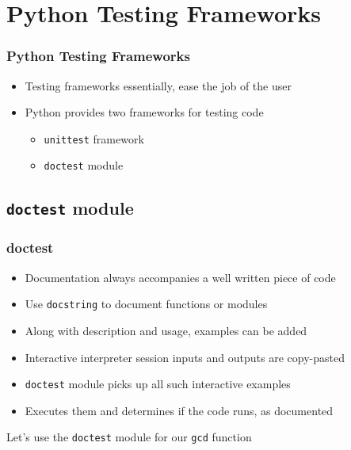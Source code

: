 \documentclass[12pt,presentation]{beamer}
\begin{document}
\section{Python Testing Frameworks}

\begin{frame}[fragile]
  \frametitle{Python Testing Frameworks}
  \begin{itemize}
  \item Testing frameworks essentially, ease the job of the user
  \item Python provides two frameworks for testing code
    \begin{itemize}
    \item \texttt{unittest} framework
    \item \texttt{doctest} module
    \end{itemize}
  \end{itemize}
\end{frame}

\subsection{\texttt{doctest} module}

\begin{frame}[fragile]
  \frametitle{doctest}
  \begin{itemize}
  \item Documentation always accompanies a well written piece of code
  \item Use \texttt{docstring} to document functions or modules
  \item Along with description and usage, examples can be added
  \item Interactive interpreter session inputs and outputs are
    copy-pasted 
  \item \texttt{doctest} module picks up all such interactive examples
  \item Executes them and determines if the code runs, as documented
  \end{itemize}
  Let's use the \texttt{doctest} module for our \texttt{gcd} function
\end{frame}
\end{document}
